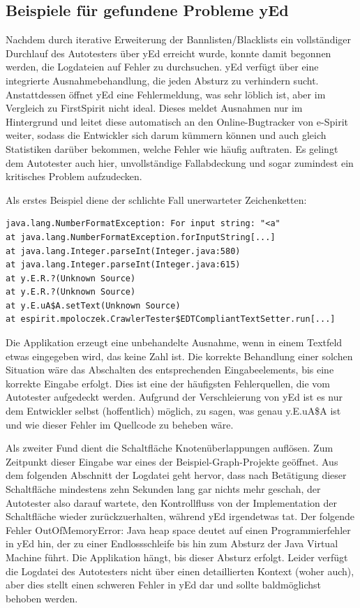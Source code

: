\subsection{Beispiele für gefundene Probleme yEd}

Nachdem durch iterative Erweiterung der Bannlisten/Blacklists
ein vollständiger Durchlauf des Autotesters über yEd erreicht wurde,
konnte damit begonnen werden, die Logdateien auf Fehler zu
durchsuchen. yEd verfügt über eine integrierte Ausnahmebehandlung,
die jeden Absturz zu verhindern sucht. Anstattdessen öffnet yEd eine
Fehlermeldung, was sehr löblich ist, aber im Vergleich zu FirstSpirit
nicht ideal. Dieses meldet Ausnahmen nur im Hintergrund und leitet
diese automatisch an den Online-Bugtracker von e-Spirit weiter,
sodass die Entwickler sich darum kümmern können und auch gleich
Statistiken darüber bekommen, welche Fehler wie häufig auftraten.
Es gelingt dem Autotester auch hier, unvollständige Fallabdeckung
und sogar zumindest ein kritisches Problem aufzudecken.

Als erstes Beispiel diene der schlichte Fall unerwarteter Zeichenketten:

\begin{lstlisting}[float=!ht,label=fmjson,caption={Ausnahme bei Eingabe einer Nicht-Zahl}]
java.lang.NumberFormatException: For input string: "<a"
at java.lang.NumberFormatException.forInputString[...]
at java.lang.Integer.parseInt(Integer.java:580)
at java.lang.Integer.parseInt(Integer.java:615)
at y.E.R.?(Unknown Source)
at y.E.R.?(Unknown Source)
at y.E.uA$A.setText(Unknown Source)
at espirit.mpoloczek.CrawlerTester$EDTCompliantTextSetter.run[...]
\end{lstlisting}

Die Applikation erzeugt eine unbehandelte Ausnahme, wenn in einem
Textfeld etwas eingegeben wird, das keine Zahl ist. Die korrekte Behandlung
einer solchen Situation wäre das Abschalten des entsprechenden Eingabeelements,
bis eine korrekte Eingabe erfolgt. Dies ist eine der häufigsten Fehlerquellen,
die vom Autotester aufgedeckt werden. Aufgrund der Verschleierung von
yEd ist es nur dem Entwickler selbst (hoffentlich) möglich, zu sagen,
was genau \glqq{}y.E.uA\$A\grqq{} ist und wie dieser Fehler im Quellcode
zu beheben wäre.

Als zweiter Fund dient die Schaltfläche \glqq{}Knotenüberlappungen auflösen\grqq{}.
Zum Zeitpunkt dieser Eingabe war eines der Beispiel-Graph-Projekte geöffnet.
Aus dem folgenden Abschnitt der Logdatei geht hervor, dass nach Betätigung
dieser Schaltfläche mindestens zehn Sekunden lang gar nichts mehr geschah,
der Autotester also darauf wartete, den Kontrollfluss von der Implementation der
Schaltfläche wieder zurückzuerhalten, während yEd irgendetwas tat. Der
folgende Fehler \glqq{}OutOfMemoryError: Java heap space\grqq{}
deutet auf einen Programmierfehler in yEd hin, der zu einer Endlossschleife
bis hin zum Absturz der Java Virtual Machine führt. Die Applikation \glqq{}hängt\grqq{}, bis
dieser Absturz erfolgt. Leider verfügt die Logdatei des Autotesters nicht über einen
detaillierten Kontext (woher auch), aber dies stellt einen schweren Fehler in yEd
dar und sollte baldmöglichst behoben werden.

